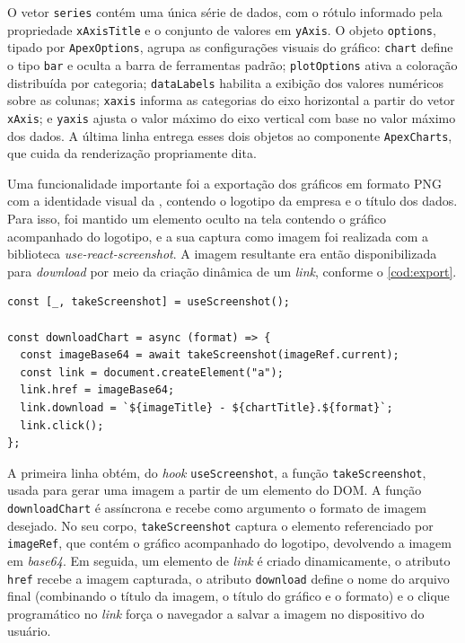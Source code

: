 O vetor \texttt{series} contém uma única série de dados, com o rótulo informado pela propriedade \texttt{xAxisTitle} e o conjunto de valores em \texttt{yAxis}. O objeto \texttt{options}, tipado por \texttt{ApexOptions}, agrupa as configurações visuais do gráfico: \texttt{chart} define o tipo \texttt{bar} e oculta a barra de ferramentas padrão; \texttt{plotOptions} ativa a coloração distribuída por categoria; \texttt{dataLabels} habilita a exibição dos valores numéricos sobre as colunas; \texttt{xaxis} informa as categorias do eixo horizontal a partir do vetor \texttt{xAxis}; e \texttt{yaxis} ajusta o valor máximo do eixo vertical com base no valor máximo dos dados. A última linha entrega esses dois objetos ao componente \texttt{ApexCharts}, que cuida da renderização propriamente dita.

Uma funcionalidade importante foi a exportação dos gráficos em formato PNG com a identidade visual da , contendo o logotipo da empresa e o título dos dados. Para isso, foi mantido um elemento oculto na tela contendo o gráfico acompanhado do logotipo, e a sua captura como imagem foi realizada com a biblioteca \textit{use-react-screenshot}. A imagem resultante era então disponibilizada para \textit{download} por meio da criação dinâmica de um \textit{link}, conforme o \autoref{cod:export}.

\begin{lstlisting}[caption={Trecho da exportação de um gráfico em PNG com \textit{use-react-screenshot}.}, label={cod:export}]
const [_, takeScreenshot] = useScreenshot();

const downloadChart = async (format) => {
  const imageBase64 = await takeScreenshot(imageRef.current);
  const link = document.createElement("a");
  link.href = imageBase64;
  link.download = `${imageTitle} - ${chartTitle}.${format}`;
  link.click();
};
\end{lstlisting}

A primeira linha obtém, do \textit{hook} \texttt{useScreenshot}, a função \texttt{takeScreenshot}, usada para gerar uma imagem a partir de um elemento do DOM. A função \texttt{downloadChart} é assíncrona e recebe como argumento o formato de imagem desejado. No seu corpo, \texttt{takeScreenshot} captura o elemento referenciado por \texttt{imageRef}, que contém o gráfico acompanhado do logotipo, devolvendo a imagem em \textit{base64}. Em seguida, um elemento de \textit{link} é criado dinamicamente, o atributo \texttt{href} recebe a imagem capturada, o atributo \texttt{download} define o nome do arquivo final (combinando o título da imagem, o título do gráfico e o formato) e o clique programático no \textit{link} força o navegador a salvar a imagem no dispositivo do usuário.

